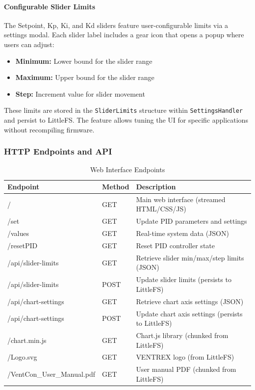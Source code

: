\paragraph{Configurable Slider Limits}
The Setpoint, Kp, Ki, and Kd sliders feature user-configurable limits via a settings modal. Each slider label includes a gear icon that opens a popup where users can adjust:
\begin{itemize}
    \item \textbf{Minimum:} Lower bound for the slider range
    \item \textbf{Maximum:} Upper bound for the slider range
    \item \textbf{Step:} Increment value for slider movement
\end{itemize}
These limits are stored in the \texttt{SliderLimits} structure within \texttt{SettingsHandler} and persist to LittleFS. The feature allows tuning the UI for specific applications without recompiling firmware.

\subsubsection{HTTP Endpoints and API}

\begin{table}[H]
\centering
\begin{tabular}{@{}lll@{}}
\toprule
\textbf{Endpoint} & \textbf{Method} & \textbf{Description} \\
\midrule
/ & GET & Main web interface (streamed HTML/CSS/JS) \\
/set & GET & Update PID parameters and settings \\
/values & GET & Real-time system data (JSON) \\
/resetPID & GET & Reset PID controller state \\
/api/slider-limits & GET & Retrieve slider min/max/step limits (JSON) \\
/api/slider-limits & POST & Update slider limits (persists to LittleFS) \\
/api/chart-settings & GET & Retrieve chart axis settings (JSON) \\
/api/chart-settings & POST & Update chart axis settings (persists to LittleFS) \\
/chart.min.js & GET & Chart.js library (chunked from LittleFS) \\
/Logo.svg & GET & VENTREX logo (from LittleFS) \\
/VentCon\_User\_Manual.pdf & GET & User manual PDF (chunked from LittleFS) \\
\bottomrule
\end{tabular}
\caption{Web Interface Endpoints}
\end{table}

